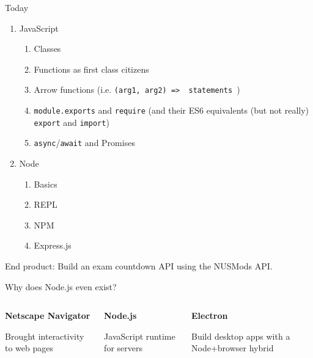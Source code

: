 \documentclass{beamer}
\begin{document}
\begin{frame}[fragile]{Today}
    \begin{enumerate}
        \item JavaScript
            \begin{enumerate}
                \item Classes
                \item Functions as first class citizens
                \item Arrow functions (i.e. \texttt{(arg1, arg2) => { statements }})
                \item \texttt{module.exports} and \texttt{require} (and their ES6 equivalents (but not really) \texttt{export} and \texttt{import})
                \item \texttt{async}/\texttt{await} and Promises
            \end{enumerate}
        \item Node
            \begin{enumerate}
                \item Basics
                \item REPL
                \item NPM
                \item Express.js
            \end{enumerate}
    \end{enumerate}

    End product: Build an exam countdown API using the NUSMods API.
\end{frame}

\begin{frame}[fragile]{Why does Node.js even exist?}
    \begin{columns}
        \begin{column}{0.3\textwidth}
            \begin{center}
                \textbf{Netscape Navigator}

                Brought interactivity to web pages
            \end{center}
        \end{column}
        \begin{column}{0.3\textwidth}
            \begin{center}
                \textbf{Node.js}

                JavaScript runtime for servers
            \end{center}
        \end{column}
        \begin{column}{0.3\textwidth}
            \begin{center}
                \textbf{Electron}

                Build desktop apps with a Node+browser hybrid
            \end{center}
        \end{column}
    \end{columns}
\end{frame}
\end{document}
